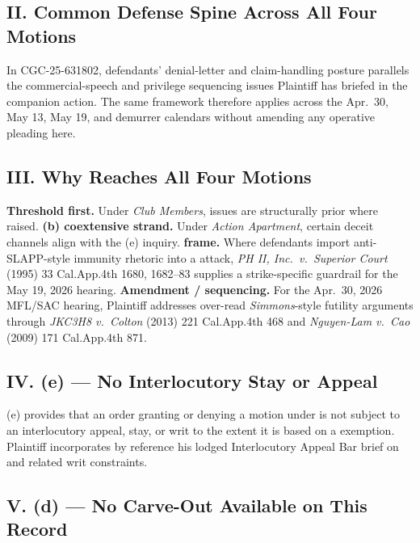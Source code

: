 \subsection*{II. Common Defense Spine Across All Four Motions}

In CGC-25-631802, defendants' denial-letter and claim-handling posture parallels the commercial-speech and privilege sequencing issues Plaintiff has briefed in the companion action. The same  framework therefore applies across the Apr.\ 30, May 13, May 19, and demurrer calendars without amending any operative pleading here.

\subsection*{III. Why  Reaches All Four Motions}

\textbf{Threshold first.} Under \textit{Club Members},  issues are structurally prior where raised. \textbf{(b) coextensive strand.} Under \textit{Action Apartment}, certain deceit channels align with the (e) inquiry. \textbf{ frame.} Where defendants import anti-SLAPP-style immunity rhetoric into a  attack, \textit{PH II, Inc.\ v.\ Superior Court} (1995) 33 Cal.App.4th 1680, 1682--83 supplies a strike-specific guardrail for the May 19, 2026 hearing. \textbf{Amendment /  sequencing.} For the Apr.\ 30, 2026 MFL/SAC hearing, Plaintiff addresses over-read \textit{Simmons}-style futility arguments through \textit{JKC3H8 v.\ Colton} (2013) 221 Cal.App.4th 468 and \textit{Nguyen-Lam v.\ Cao} (2009) 171 Cal.App.4th 871.

\subsection*{IV. (e) --- No Interlocutory Stay or Appeal}

(e) provides that an order granting or denying a motion under  is not subject to an interlocutory appeal, stay, or writ to the extent it is based on a  exemption. Plaintiff incorporates by reference his lodged Interlocutory Appeal Bar brief on  and related writ constraints.

\subsection*{V. (d) --- No Carve-Out Available on This Record}

